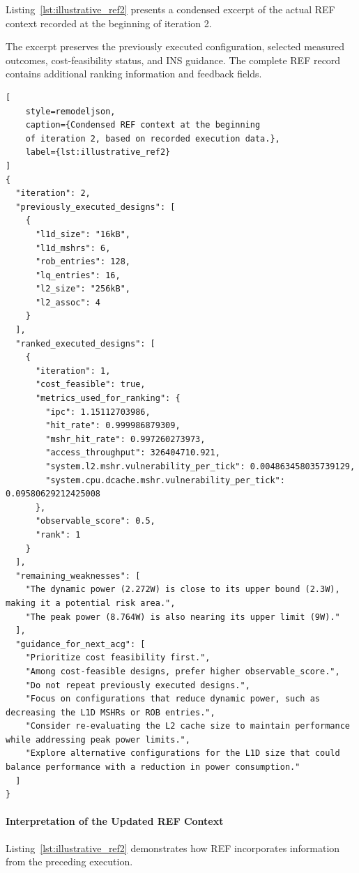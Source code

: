 Listing~\ref{lst:illustrative_ref2}
presents a condensed excerpt of the actual
REF context recorded at the beginning of
iteration 2.

The excerpt preserves the previously executed
configuration, selected measured outcomes,
cost-feasibility status, and INS guidance.
The complete REF record contains additional
ranking information and feedback fields.

\begin{lstlisting}[
    style=remodeljson,
    caption={Condensed REF context at the beginning
    of iteration 2, based on recorded execution data.},
    label={lst:illustrative_ref2}
]
{
  "iteration": 2,
  "previously_executed_designs": [
    {
      "l1d_size": "16kB",
      "l1d_mshrs": 6,
      "rob_entries": 128,
      "lq_entries": 16,
      "l2_size": "256kB",
      "l2_assoc": 4
    }
  ],
  "ranked_executed_designs": [
    {
      "iteration": 1,
      "cost_feasible": true,
      "metrics_used_for_ranking": {
        "ipc": 1.15112703986,
        "hit_rate": 0.999986879309,
        "mshr_hit_rate": 0.997260273973,
        "access_throughput": 326404710.921,
        "system.l2.mshr.vulnerability_per_tick": 0.004863458035739129,
        "system.cpu.dcache.mshr.vulnerability_per_tick": 0.09580629212425008
      },
      "observable_score": 0.5,
      "rank": 1
    }
  ],
  "remaining_weaknesses": [
    "The dynamic power (2.272W) is close to its upper bound (2.3W), making it a potential risk area.",
    "The peak power (8.764W) is also nearing its upper limit (9W)."
  ],
  "guidance_for_next_acg": [
    "Prioritize cost feasibility first.",
    "Among cost-feasible designs, prefer higher observable_score.",
    "Do not repeat previously executed designs.",
    "Focus on configurations that reduce dynamic power, such as decreasing the L1D MSHRs or ROB entries.",
    "Consider re-evaluating the L2 cache size to maintain performance while addressing peak power limits.",
    "Explore alternative configurations for the L1D size that could balance performance with a reduction in power consumption."
  ]
}
\end{lstlisting}

\paragraph{Interpretation of the Updated REF Context}

Listing~\ref{lst:illustrative_ref2}
demonstrates how REF incorporates information
from the preceding execution.

